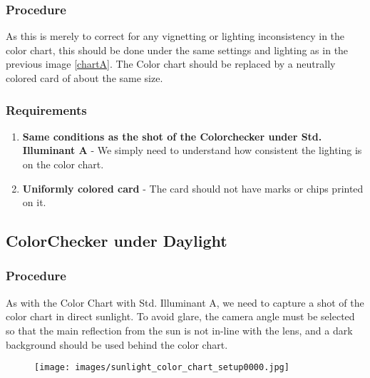 \documentclass[twoside]{article}
\begin{document}
\subsubsection{Procedure}
As this is merely to correct for any vignetting or lighting inconsistency in the color chart, this should be done under the same settings and lighting as in the previous image \ref{chartA}. The Color chart should be replaced by a neutrally colored card of about the same size.

\subsubsection{Requirements}
\begin{enumerate}
    \item \textbf{Same conditions as the shot of the Colorchecker under Std. Illuminant A} - We simply need to understand how consistent the lighting is on the color chart.
    \item \textbf{Uniformly colored card} - The card should not have marks or chips printed on it.
\end{enumerate}


\newpage
\subsection{ColorChecker under Daylight}

\subsubsection{Procedure}
As with the Color Chart with Std. Illuminant A, we need to capture a shot of the color chart in direct sunlight. To avoid glare, the camera angle must be selected so that the main reflection from the sun is not in-line with the lens, and a dark background should be used behind the color chart.


\begin{figure}[ht]
    \centering
    \texttt{[image: images/sunlight\_color\_chart\_setup0000.jpg]}
\end{figure}
\end{document}
